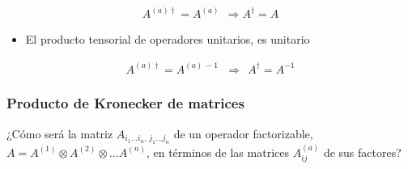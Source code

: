 \documentclass[letterpaper,10pt,english]{jupyterBook}
\begin{document}
\begin{equation*}
\begin{split} A^{(a)\dagger} = A^{(a)} ~~\Longrightarrow A^{\dagger} = A \end{split}
\end{equation*}\begin{itemize}
\item {} 
\sphinxAtStartPar
El producto tensorial de operadores unitarios, es unitario

\end{itemize}
\begin{equation*}
\begin{split} A^{(a)\dagger} = A^{(a)\, -1} \,  ~~\Longrightarrow ~~A^{\dagger} = A^{-1} \end{split}
\end{equation*}
\sphinxAtStartPar



\subsubsection{Producto de Kronecker de matrices}
\label{\detokenize{docs/Part_01_Formalismo/Chapter_01_02_Formalismo_matem_xe1tico/01_04_Tensores_myst:producto-de-kronecker-de-matrices}}
\sphinxAtStartPar
¿Cómo será la matriz \(A_{i_1...i_n, \, j_1...j_n}\) de un operador factorizable, \( A = A^{(1)}\otimes A^{(2)} \otimes ...A^{(n)}\), en términos de las matrices  \( A^{(a)}_{ij}\) de sus factores?
\end{document}
